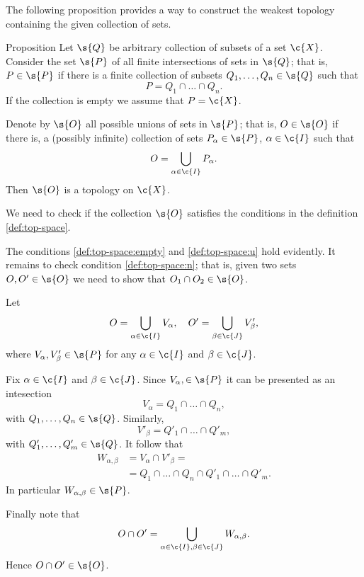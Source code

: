  
 
 
The following proposition provides a way to construct the weakest topology containing the given collection of sets.

\begin{thm}{Proposition}
Let $\s{Q}$ be arbitrary collection of subsets of a set $\c{X}$.
Consider the set $\s{P}$ of all finite intersections of sets in $\s{Q}$;
that is, $P\in \s{P}$ if there is a finite collection of subsets $Q_1,\dots,Q_n\in \s{Q}$ such that 
\[P=Q_1\cap\dots\cap Q_n.\]
If the collection is empty we assume that $P=\c{X}$.

Denote by $\s{O}$ all possible unions of sets in $\s{P}$;
that is, $O\in \s{O}$ if there is, a (possibly infinite) collection of sets $P_\alpha\in\s{P}$, $\alpha\in\c{I}$ such that 
\[O=\bigcup_{\alpha\in\c{I}}P_\alpha.\]
Then $\s{O}$ is a topology on $\c{X}$.
\end{thm}

We need to check if the collection $\s{O}$ satisfies the conditions in the definition \ref{def:top-space}.

The conditions \ref{def:top-space:empty} and \ref{def:top-space:u} hold evidently.
It remains to check condition \ref{def:top-space:n};
that is, given two sets $O,O'\in\s{O}$ we need to show that $O_1\cap O_2\in \s{O}$.

Let
\[O=\bigcup_{\alpha\in \c{I}}V_\alpha,\quad O'=\bigcup_{\beta\in \c{J}}V'_\beta,\]
where  $V_\alpha,V'_\beta\in\s{P}$ for any $\alpha\in\c{I}$ and $\beta\in\c{J}$.

Fix $\alpha\in\c{I}$ and $\beta\in\c{J}$.
Since $V_\alpha,\in\s{P}$ it can be presented as an intesection
\[V_\alpha=Q_1\cap \dots \cap Q_n,\]
with $Q_1,\dots,Q_n\in \s{Q}$.
Similarly, 
\[V'_\beta=Q'_1\cap \dots \cap Q'_m,\]
with $Q'_1,\dots,Q'_m\in \s{Q}$.
It follow that 
\begin{align*}
W_{\alpha,\beta}&=V_\alpha\cap V'_\beta=
\\
&=Q_1\cap \dots \cap Q_n\cap Q'_1\cap \dots \cap Q'_m.
\end{align*}
In particular $W_{\alpha,\beta}\in \s{P}$.

Finally note that
\[O\cap O'=\bigcup_{\alpha\in \c{I},\beta\in\c{J}}W_{\alpha,\beta}.\]
Hence $O\cap O'\in \s{O}$.
\qeds
